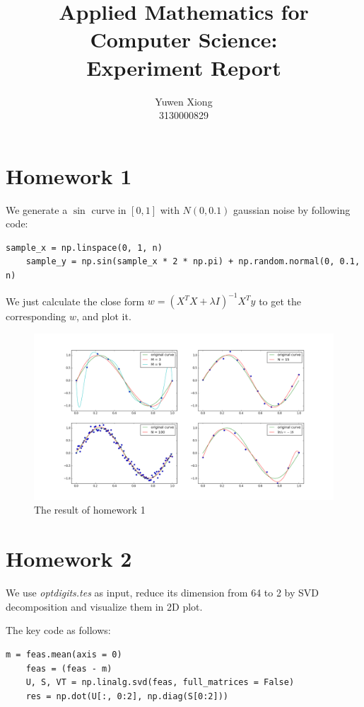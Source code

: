 \documentclass[12pt]{article}
\title{Applied Mathematics for Computer Science: \\Experiment Report}
\author{Yuwen Xiong\\3130000829}
\begin{document}
\maketitle

\section{Homework 1} 

We generate a $\sin$ curve in $[0, 1]$ with $N(0, 0.1)$ gaussian noise by following code:
\begin{lstlisting}[frame=single]
    sample_x = np.linspace(0, 1, n)
    sample_y = np.sin(sample_x * 2 * np.pi) + np.random.normal(0, 0.1, n)
\end{lstlisting}

We just calculate the close form $w = (X^TX + \lambda I)^{-1}X^Ty$ to get the corresponding $w$, and plot it.

\begin{figure}[hbtp]
  \centering
  \includegraphics[width=12.5cm]{hw1_result.png}
  \caption{The result of homework 1}
\end{figure}


\section{Homework 2}

We use {\em optdigits.tes} as input, reduce its dimension from 64 to 2 by SVD decomposition and visualize them in 2D plot. 

The key code as follows:

\begin{lstlisting}[frame=single]
    m = feas.mean(axis = 0)
    feas = (feas - m)
    U, S, VT = np.linalg.svd(feas, full_matrices = False)
    res = np.dot(U[:, 0:2], np.diag(S[0:2]))
\end{lstlisting}
\end{document}
